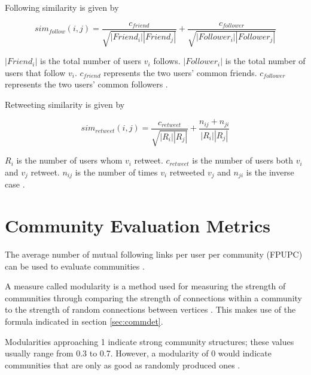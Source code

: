 Following similarity is given by 

\begin{equation}
sim_{follow}(i,j) = \frac{c_{friend}}{\sqrt{\left|{Friend_i}\right|\left|{Friend_j}\right|}} + \frac{c_{follower}}{\sqrt{\left|{Follower_i}\right|\left|{Follower_j}\right|}}
\end{equation}

$\left|{Friend_i}\right|$ is the total number of users $v_i$ follows. $\left|{Follower_i}\right|$ is the total number of users that follow $v_i$. $c_{friend}$ represents the two users’ common friends. $c_{follower}$ represents the two users’ common followers \cite{Zhang:2012}.

Retweeting similarity is given by 

\begin{equation}
sim_{retweet}(i,j) = \frac{c_{retweet}}{\sqrt{\left|{R_i}\right|\left|{R_j}\right|}} + \frac{n_{ij} + n_{ji}}{\left|{R_i}\right|\left|{R_j}\right|}
\end{equation}

$R_i$ is the number of users whom $v_i$ retweet. $c_{retweet}$ is the number of users both $v_i$ and $v_j$ retweet. $n_{ij}$ is the number of times $v_i$ retweeted $v_j$ and $n_{ji}$ is the inverse case \cite{Zhang:2012}. 

\section{Community Evaluation Metrics}

The average number of mutual following links per user per community (FPUPC) can be used to evaluate communities \cite{Zhang:2012}. 

A measure called modularity is a method used for measuring the strength of communities through comparing the strength of connections within a community to the strength of random connections between vertices \cite{Newman:2004}. This makes use of the formula indicated in section \ref{sec:commdet}.

Modularities approaching 1 indicate strong community structures; these values usually range from 0.3 to 0.7. However, a modularity of 0 would indicate communities that are only as good as randomly produced ones \cite{Newman:2004}. 
